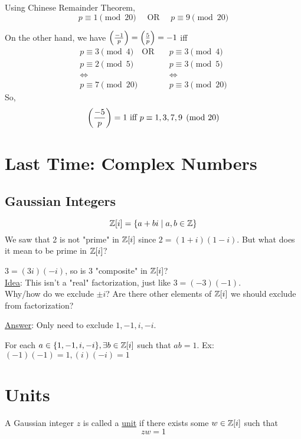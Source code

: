     Using Chinese Remainder Theorem, 
    \[
        p\equiv 1\pmod{20} \quad\text{ OR }\quad p\equiv 9\pmod{20}
    \]

    On the other hand, we have $\left( \frac{-1}{p} \right)  = \left( \frac{5}{p} \right)  = -1$ iff
    \begin{align*}
        p\equiv 3\pmod{4} \quad\text{OR}&\quad p\equiv 3\pmod{4} \\
        p\equiv 2\pmod{5} \quad&\quad  p\equiv 3\pmod{5} \\
        \Longleftrightarrow\quad & \quad\Longleftrightarrow \\
        p\equiv 7\pmod{20} \quad&\quad p\equiv 3\pmod{20}
    \end{align*}
    So,
    \[
        \left( \frac{-5}{p} \right)  = 1 \text{ iff } p\equiv 1,3,7,9\pmod{20}
    \]

\section{Last Time: Complex Numbers}
    \subsection{Gaussian Integers}
    \[
        \mathbb{Z}[i] = \{ a+bi\mid a,b\in\mathbb{Z} \}
    \]
    We saw that 2 is not "prime" in $\mathbb{Z}[i]$ since $2=(1+i)(1-i)$. 
    But what does it mean to be prime in $\mathbb{Z}[i]$?

    $3 = (3i)(-i)$, so is 3 "composite" in $\mathbb{Z}[i]$? \\
    \underline{Idea}: This isn't a "real" factorization, just like $3 = (-3)(-1)$. \\

    Why/how do we exclude $\pm i$?
    Are there other elements of $\mathbb{Z}[i]$ we should exclude from factorization?

    \underline{Answer}: Only need to exclude $1,-1,i,-i$.

    For each $a\in\{ 1,-1,i,-i \}, \exists b\in\mathbb{Z}[i]$ such that $ab=1$.
    Ex: $(-1)(-1) = 1, (i)(-i) = 1$ \\

    \section{Units}
    \begin{definition}
        A Gaussian integer $z$ is called a \underline{unit} if there exists some $w\in\mathbb{Z}[i]$
        such that 
        \[
            zw=1
        \]
    \end{definition}

